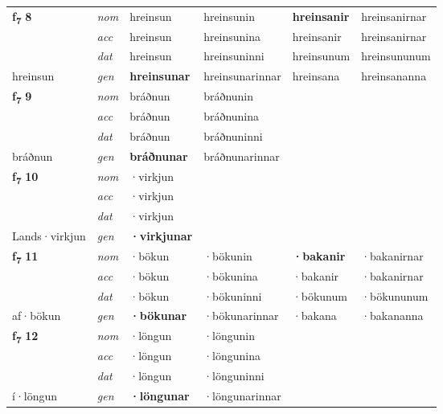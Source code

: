 \begin{longtable}[l]{X>{\footnotesize\itshape}XXXXX}
\multirow{3}{*}{{{\textbf{f{\textsubscript{7}}} \Large{\textbf{8}}}}} & nom & hreinsun & hreinsunin & \textbf{hreinsanir} & hreinsanirnar \\*
 & acc & hreinsun & hreinsunina & hreinsanir & hreinsanirnar \\*
 & dat & hreinsun & hreinsuninni & hreinsunum & hreinsununum \\*
 {\footnotesize{hreinsun}} & gen & \textbf{hreinsunar} & hreinsunarinnar & hreinsana & hreinsananna \\
\cmidrule{1-6}

\multirow{3}{*}{{{\textbf{f{\textsubscript{7}}} \Large{\textbf{9}}}}} & nom & bráðnun & bráðnunin & \textbf{} &  \\*
 & acc & bráðnun & bráðnunina &  &  \\*
 & dat & bráðnun & bráðnuninni &  &  \\*
 {\footnotesize{bráðnun}} & gen & \textbf{bráðnunar} & bráðnunarinnar &  &  \\
\cmidrule{1-6}

\multirow{3}{*}{{{\textbf{f{\textsubscript{7}}} \Large{\textbf{10}}}}} & nom & ·virkjun &  & \textbf{} &  \\*
 & acc & ·virkjun &  &  &  \\*
 & dat & ·virkjun &  &  &  \\*
 {\footnotesize{Lands\allowbreak ·virkjun}} & gen & \textbf{·virkjunar} &  &  &  \\
\cmidrule{1-6}

\multirow{3}{*}{{{\textbf{f{\textsubscript{7}}} \Large{\textbf{11}}}}} & nom & ·bökun & ·bökunin & \textbf{·bakanir} & ·bakanirnar \\*
 & acc & ·bökun & ·bökunina & ·bakanir & ·bakanirnar \\*
 & dat & ·bökun & ·bökuninni & ·bökunum & ·bökununum \\*
 {\footnotesize{af\allowbreak ·bökun}} & gen & \textbf{·bökunar} & ·bökunarinnar & ·bakana & ·bakananna \\
\cmidrule{1-6}

\multirow{3}{*}{{{\textbf{f{\textsubscript{7}}} \Large{\textbf{12}}}}} & nom & ·löngun & ·löngunin & \textbf{} &  \\*
 & acc & ·löngun & ·löngunina &  &  \\*
 & dat & ·löngun & ·lönguninni &  &  \\*
 {\footnotesize{í\allowbreak ·löngun}} & gen & \textbf{·löngunar} & ·löngunarinnar &  &  \\
\cmidrule{1-6}


\end{longtable}
